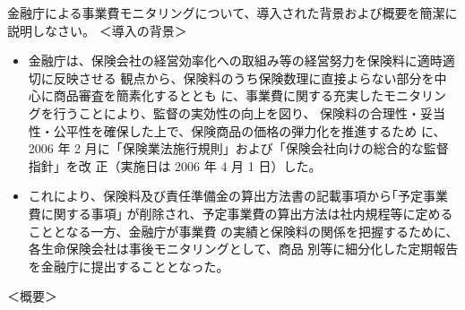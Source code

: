 \documentclass[report,gutter=10mm,fore-edge=10mm,uplatex,dvipdfmx]{jlreq}
\begin{document}
金融庁による事業費モニタリングについて、導入された背景および概要を簡潔に説明しなさい。
\answer{}
＜導入の背景＞
\begin{itemize}
 \item[] 金融庁は、保険会社の経営効率化への取組み等の経営努力を保険料に適時適切に反映させる
 観点から、保険料のうち保険数理に直接よらない部分を中心に商品審査を簡素化するととも
 に、事業費に関する充実したモニタリングを行うことにより、監督の実効性の向上を図り、
 保険料の合理性・妥当性・公平性を確保した上で、保険商品の価格の弾力化を推進するため
 に、2006 年 2 月に「保険業法施行規則」および「保険会社向けの総合的な監督指針」を改
 正（実施日は 2006 年 4 月 1 日）した。
 \item[] これにより、保険料及び責任準備金の算出方法書の記載事項から｢予定事業費に関する事項｣
 が削除され、予定事業費の算出方法は社内規程等に定めることとなる一方、金融庁が事業費
 の実績と保険料の関係を把握するために、各生命保険会社は事後モニタリングとして、商品
 別等に細分化した定期報告を金融庁に提出することとなった。
\end{itemize}
＜概要＞
\end{document}
